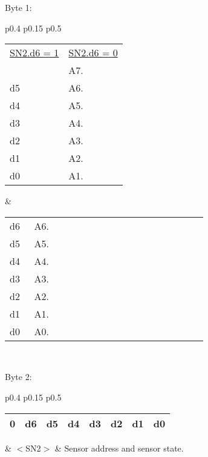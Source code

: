 Byte 1:

\begin{tabular}{p{0.4\linewidth} p{0.15\linewidth} p{0.5\linewidth}} 

\begin{tabular}{|p{0.3cm}|p{0.3cm}|p{0.3cm}|p{0.3cm}|p{0.3cm}|p{0.3cm}|p{0.3cm}|p{0.3cm}|}
\hline
0 & d6 & d5 & d4 & d3 & d2 & d1 & d0\\
\hline
\end{tabular}
& $<$SN1$>$ & Sensor address.\\
\end{tabular}

\begin{tabular}{p{0.5\linewidth} p{0.5\linewidth}}
\underline{SN2.d6 = 1} & \underline{SN2.d6 = 0}\\
\begin{tabular}{p{0.05\linewidth} p{0.6\linewidth}} 
d6 & A7.\\
d5 & A6.\\
d4 & A5.\\
d3 & A4.\\
d2 & A3.\\
d1 & A2.\\
d0 & A1.\\
\end{tabular} &
\begin{tabular}{p{0.05\linewidth} p{0.6\linewidth}} 
d6 & A6.\\
d5 & A5.\\
d4 & A4.\\
d3 & A3.\\
d2 & A2.\\
d1 & A1.\\
d0 & A0.\\
\end{tabular} \\

\end{tabular}

Byte 2:

\begin{tabular}{p{0.4\linewidth} p{0.15\linewidth} p{0.5\linewidth}} 

\begin{tabular}{|p{0.3cm}|p{0.3cm}|p{0.3cm}|p{0.3cm}|p{0.3cm}|p{0.3cm}|p{0.3cm}|p{0.3cm}|}
\hline
0 & d6 & d5 & d4 & d3 & d2 & d1 & d0\\
\hline
\end{tabular}
& $<$SN2$>$ & Sensor address and sensor state.\\
\end{tabular}

